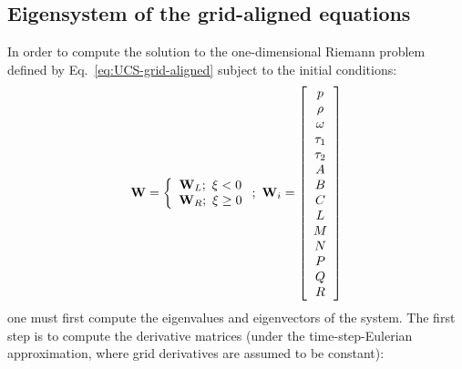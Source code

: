 \subsection{Eigensystem of the grid-aligned equations}

In order to compute the solution to the one-dimensional Riemann problem defined by Eq.~\ref{eq:UCS-grid-aligned} subject to the initial conditions:
\[{\bf{W}} = \left\{ {\begin{array}{*{20}{c}}
{{{\bf{W}}_L};\,\,\xi  < 0}\\
{{{\bf{W}}_R};\,\,\xi  \ge 0}
\end{array}} \right.;\,\,{{\bf{W}}_i} = \left[ {\begin{array}{*{20}{c}}
p\\
\rho \\
\omega \\
{{\tau _1}}\\
{{\tau _2}}\\
A\\
B\\
C\\
L\\
M\\
N\\
P\\
Q\\
R
\end{array}} \right]\]
one must first compute the eigenvalues and eigenvectors of the system. The first step is to compute the derivative matrices (under the time-step-Eulerian approximation, where grid derivatives are assumed to be constant):
